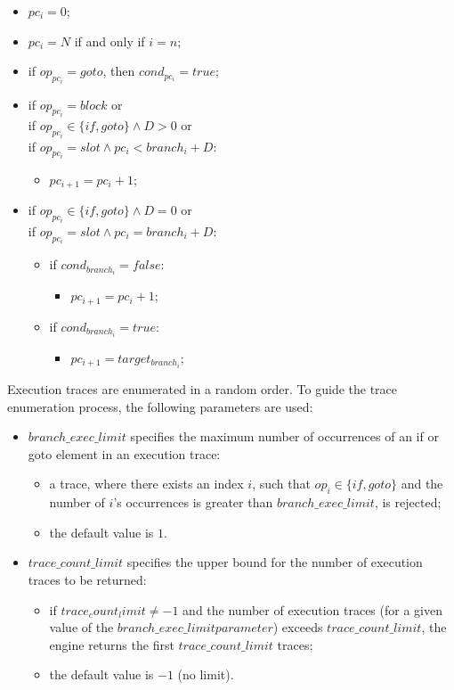 \begin{itemize}
\item $pc_i = 0$;
\item $pc_i = N$ if and only if $i = n$;
\item if $op_{pc_i} = goto$, then $cond_{pc_i} = true$;
\item if $op_{pc_i} = block$ or\\
      if $op_{pc_i} \in \{if, goto\} \wedge D > 0$ or\\
      if $op_{pc_i} = slot \wedge pc_i < branch_i+ D$:
  \begin{itemize}
  \item $pc_{i+1} = pc_i + 1$;
  \end{itemize}
\item if $op_{pc_i} \in \{if, goto\} \wedge D = 0$ or\\
      if $op_{pc_i} = slot \wedge pc_i = branch_i + D$:
  \begin{itemize}
  \item if $cond_{branch_i} = false$:
    \begin{itemize}
    \item $pc_{i+1} = pc_i + 1$;
    \end{itemize}
  \item if $cond_{branch_i} = true$:
    \begin{itemize}
    \item $pc_{i+1} = target_{branch_i}$;
    \end{itemize}
  \end{itemize}
\end{itemize}

Execution traces are enumerated in a random order.
To guide the trace enumeration process, the following parameters are used:

\begin{itemize}
\item
$branch\_exec\_limit$ specifies the maximum number of occurrences of an if or goto element in an execution trace:
  \begin{itemize}
  \item a trace, where there exists an index $i$, such that $op_i \in \{if, goto\}$ and the number of $i$’s occurrences is greater than $branch\_exec\_limit$, is rejected;
  \item the default value is $1$.
  \end{itemize}
\item
$trace\_count\_limit$ specifies the upper bound for the number of execution traces to be returned:
  \begin{itemize}
  \item if $trace_count_limit \ne -1$ and the number of execution traces (for a given value of the $branch\_exec\_limit parameter$) exceeds $trace\_count\_limit$,
    the engine returns the first $trace\_count\_limit$ traces;
  \item the default value is $-1$ (no limit).
  \end{itemize}
\end{itemize}

